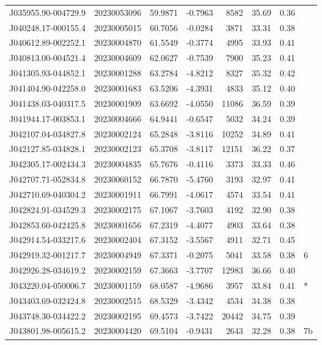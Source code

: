 \documentclass{article}
\begin{document}
\begin {longtable}{|l|l|r|r|r|r|r|l|}
 J035955.90-004729.9&  20230053096&   59.9871&   -0.7963&  8582& 35.69& 0.36&\\
 J040248.17-000155.4&  20230005015&   60.7056&   -0.0284&  3871& 33.31& 0.38&\\
 J040612.89-002252.1&  20230004870&   61.5549&   -0.3774&  4995& 33.93& 0.41&\\
 J040813.00-004521.4&  20230004609&   62.0627&   -0.7539&  7900& 35.23& 0.41&\\
 J041305.93-044852.1&  20230001288&   63.2784&   -4.8212&  8327& 35.32& 0.42&\\
 J041404.90-042258.0&  20230001683&   63.5206&   -4.3931&  4833& 35.12& 0.40&\\
 J041438.03-040317.5&  20230001909&   63.6692&   -4.0550& 11086& 36.59& 0.39&\\
 J041944.17-003853.1&  20230004666&   64.9441&   -0.6547&  5032& 34.24& 0.39&\\
 J042107.04-034827.8&  20230002124&   65.2848&   -3.8116& 10252& 34.89& 0.41&\\
 J042127.85-034828.1&  20230002123&   65.3708&   -3.8117& 12151& 36.22& 0.37&\\
 J042305.17-002434.3&  20230004835&   65.7676&   -0.4116&  3373& 33.33& 0.46&\\
 J042707.71-052834.8&  20230060152&   66.7870&   -5.4760&  3193& 32.97& 0.41&\\
 J042710.69-040304.2&  20230001911&   66.7991&   -4.0617&  4574& 33.54& 0.41&\\
 J042824.91-034529.3&  20230002175&   67.1067&   -3.7603&  4192& 32.90& 0.38&\\
 J042853.60-042425.8&  20230001656&   67.2319&   -4.4077&  4903& 33.64& 0.38&\\
 J042914.54-033217.6&  20230002404&   67.3152&   -3.5567&  4911& 32.71& 0.45&\\
 J042919.32-001217.7&  20230004949&   67.3371&   -0.2075&  5041& 33.58& 0.38&6\\%
 J042926.28-034619.2&  20230002159&   67.3663&   -3.7707& 12983& 36.66& 0.40&\\
 J043220.04-050006.7&  20230001159&   68.0587&   -4.9686&  3957& 33.84& 0.41&*\\%
 J043403.69-032424.8&  20230002515&   68.5329&   -3.4342&  4534& 34.38& 0.38&\\
 J043748.30-034422.2&  20230002195&   69.4573&   -3.7422& 20442& 34.75& 0.39&\\
 J043801.98-005615.2&  20230004420&   69.5104&   -0.9431&  2643& 32.28& 0.38&7b\\%

\end{longtable}
\end{document}
